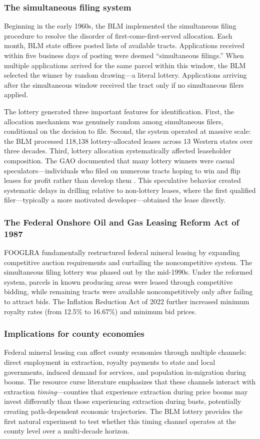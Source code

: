 \documentclass[12pt]{article}
\begin{document}
\subsubsection*{The simultaneous filing system} Beginning in the early 1960s, the BLM implemented the simultaneous filing procedure to resolve the disorder of first-come-first-served allocation. Each month, BLM state offices posted lists of available tracts. Applications received within five business days of posting were deemed ``simultaneous filings.'' When multiple applications arrived for the same parcel within this window, the BLM selected the winner by random drawing---a literal lottery. Applications arriving after the simultaneous window received the tract only if no simultaneous filers applied.

The lottery generated three important features for identification. First, the allocation mechanism was genuinely random among simultaneous filers, conditional on the decision to file. Second, the system operated at massive scale: the BLM processed 118,138 lottery-allocated leases across 13 Western states over three decades. Third, lottery allocation systematically affected leaseholder composition. The GAO documented that many lottery winners were casual speculators---individuals who filed on numerous tracts hoping to win and flip leases for profit rather than develop them \citep{gao1979lottery}. This speculative behavior created systematic delays in drilling relative to non-lottery leases, where the first qualified filer---typically a more motivated developer---obtained the lease directly.

\subsubsection*{The Federal Onshore Oil and Gas Leasing Reform Act of 1987} FOOGLRA fundamentally restructured federal mineral leasing by expanding competitive auction requirements and curtailing the noncompetitive system. The simultaneous filing lottery was phased out by the mid-1990s. Under the reformed system, parcels in known producing areas were leased through competitive bidding, while remaining tracts were available noncompetitively only after failing to attract bids. The Inflation Reduction Act of 2022 further increased minimum royalty rates (from 12.5\% to 16.67\%) and minimum bid prices.

\subsubsection*{Implications for county economies} Federal mineral leasing can affect county economies through multiple channels: direct employment in extraction, royalty payments to state and local governments, induced demand for services, and population in-migration during booms. The resource curse literature emphasizes that these channels interact with extraction \textit{timing}---counties that experience extraction during price booms may invest differently than those experiencing extraction during busts, potentially creating path-dependent economic trajectories. The BLM lottery provides the first natural experiment to test whether this timing channel operates at the county level over a multi-decade horizon.
\end{document}
